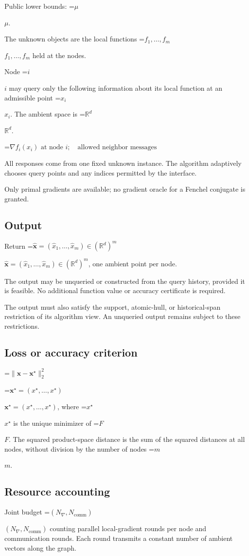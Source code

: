 \documentclass[10pt,a4paper]{article}
\newcommand{\AtlasMath}[1]{\par\begingroup\centering\setbox0=\hbox{$\displaystyle #1$}\ifdim\wd0>1.4\linewidth\typeout{ATLAS WIDE FORMULA: \the\wd0}\fi\ifdim\wd0>\linewidth\resizebox{\linewidth}{!}{\box0}\else\box0\fi\par\endgroup}
\newcommand{\AtlasInlineMath}[1]{\begingroup\setbox0=\hbox{$#1$}\ifdim\wd0>.4\linewidth\endgroup\AtlasMath{#1}\else\endgroup$#1$\fi}
\begin{document}
Public lower bounds: \AtlasInlineMath{\mu}.

The unknown objects are the local functions \AtlasInlineMath{f_1,\ldots,f_m} held at the nodes.

Node \AtlasInlineMath{i} may query only the following information about its local function at an admissible point \AtlasInlineMath{x_i}. The ambient space is \AtlasInlineMath{\mathbb R^d}.


\AtlasMath{\nabla f_i(x_i)\text{ at node }i;\quad\text{allowed neighbor messages}}


All responses come from one fixed unknown instance. The algorithm adaptively chooses query points and any indices permitted by the interface.

Only primal gradients are available; no gradient oracle for a Fenchel conjugate is granted.

\subsection{Output}
Return \AtlasInlineMath{\widehat{\boldsymbol x}=(\widehat x_1,\ldots,\widehat x_m)\in(\mathbb R^d)^m}, one ambient point per node.

The output may be unqueried or constructed from the query history, provided it is feasible. No additional function value or accuracy certificate is required.

The output must also satisfy the support, atomic-hull, or historical-span restriction of its algorithm view. An unqueried output remains subject to these restrictions.

\subsection{Loss or accuracy criterion}

\AtlasMath{\|\boldsymbol x-\boldsymbol x^\star\|_2^2}


\AtlasInlineMath{\boldsymbol{x}^\star=(x^\star,\ldots,x^\star)}, where \AtlasInlineMath{x^\star} is the unique minimizer of \AtlasInlineMath{F}. The squared product-space distance is the sum of the squared distances at all nodes, without division by the number of nodes \AtlasInlineMath{m}.

\subsection{Resource accounting}
Joint budget \AtlasInlineMath{(N_\nabla,N_{\mathrm{comm}})} counting parallel local-gradient rounds per node and communication rounds. Each round transmits a constant number of ambient vectors along the graph.
\end{document}
